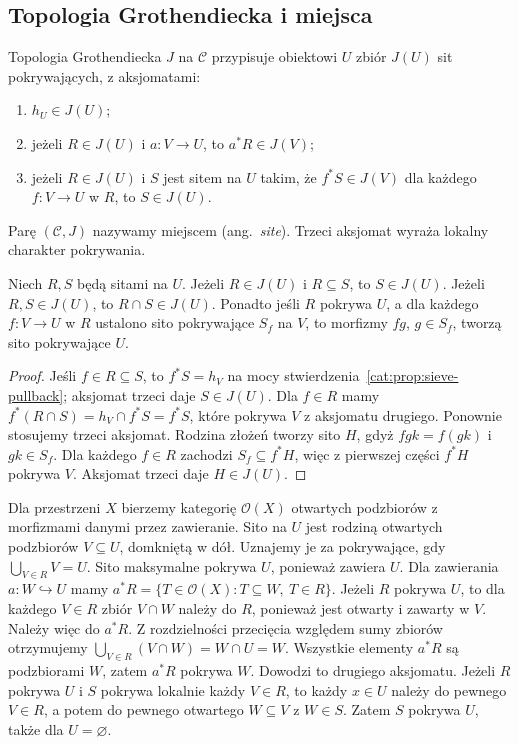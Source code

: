 \subsection{Topologia Grothendiecka i miejsca}

\begin{definicja}\label{cat:def:grothendieck-topology}
Topologia Grothendiecka $J$ na $\mathcal C$ przypisuje obiektowi $U$ zbiór $J(U)$ sit pokrywających, z aksjomatami:
\begin{enumerate}
\item $h_U\in J(U)$;
\item jeżeli $R\in J(U)$ i $a:V\to U$, to $a^*R\in J(V)$;
\item jeżeli $R\in J(U)$ i $S$ jest sitem na $U$ takim, że $f^*S\in J(V)$ dla każdego $f:V\to U$ w $R$, to $S\in J(U)$.
\end{enumerate}
Parę $(\mathcal C,J)$ nazywamy miejscem (ang.\ \emph{site}). Trzeci aksjomat wyraża lokalny charakter pokrywania.
\end{definicja}

\begin{lemat}\label{cat:lem:covering-refinement}
Niech $R,S$ będą sitami na $U$. Jeżeli $R\in J(U)$ i $R\subseteq S$, to $S\in J(U)$. Jeżeli $R,S\in J(U)$, to $R\cap S\in J(U)$. Ponadto jeśli $R$ pokrywa $U$, a dla każdego $f:V\to U$ w $R$ ustalono sito pokrywające $S_f$ na $V$, to morfizmy $fg$, $g\in S_f$, tworzą sito pokrywające $U$.
\end{lemat}
\begin{proof}
Jeśli $f\in R\subseteq S$, to $f^*S=h_V$ na mocy stwierdzenia~\ref{cat:prop:sieve-pullback}; aksjomat trzeci daje $S\in J(U)$. Dla $f\in R$ mamy $f^*(R\cap S)=h_V\cap f^*S=f^*S$, które pokrywa $V$ z aksjomatu drugiego. Ponownie stosujemy trzeci aksjomat. Rodzina złożeń tworzy sito $H$, gdyż $fgk=f(gk)$ i $gk\in S_f$. Dla każdego $f\in R$ zachodzi $S_f\subseteq f^*H$, więc z pierwszej części $f^*H$ pokrywa $V$. Aksjomat trzeci daje $H\in J(U)$.
\end{proof}

\begin{przyklad}\label{cat:ex:topological-site}
Dla przestrzeni $X$ bierzemy kategorię $\mathcal O(X)$ otwartych podzbiorów z morfizmami danymi przez zawieranie. Sito na $U$ jest rodziną otwartych podzbiorów $V\subseteq U$, domkniętą w dół. Uznajemy je za pokrywające, gdy $\bigcup_{V\in R}V=U$. Sito maksymalne pokrywa $U$, ponieważ zawiera $U$. Dla zawierania $a:W\hookrightarrow U$ mamy $a^*R=\{T\in\mathcal O(X):T\subseteq W,\ T\in R\}$. Jeżeli $R$ pokrywa $U$, to dla każdego $V\in R$ zbiór $V\cap W$ należy do $R$, ponieważ jest otwarty i zawarty w $V$. Należy więc do $a^*R$. Z rozdzielności przecięcia względem sumy zbiorów otrzymujemy $\bigcup_{V\in R}(V\cap W)=W\cap U=W$. Wszystkie elementy $a^*R$ są podzbiorami $W$, zatem $a^*R$ pokrywa $W$. Dowodzi to drugiego aksjomatu. Jeżeli $R$ pokrywa $U$ i $S$ pokrywa lokalnie każdy $V\in R$, to każdy $x\in U$ należy do pewnego $V\in R$, a potem do pewnego otwartego $W\subseteq V$ z $W\in S$. Zatem $S$ pokrywa $U$, także dla $U=\varnothing$.
\end{przyklad}

